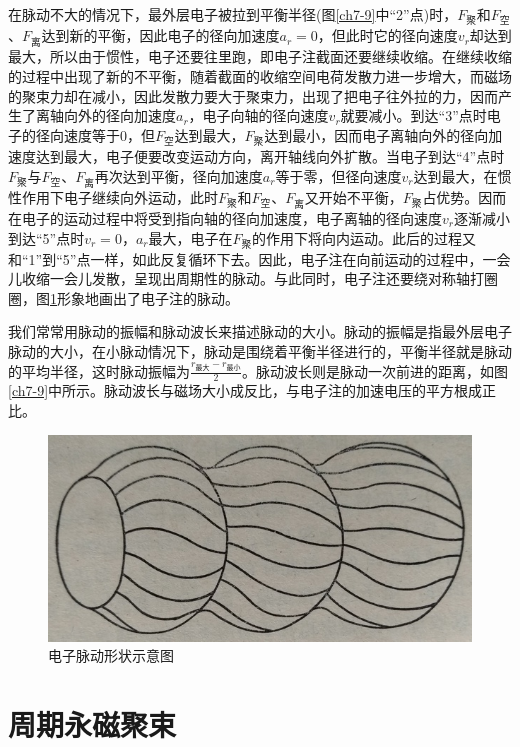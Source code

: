 在脉动不大的情况下，最外层电子被拉到平衡半径(图\ref{ch7-9}中“2”点)时，$ F_{\textrm{聚}}$和$ F_{\textrm{空}} $、$ F_{\textrm{离}} $达到新的平衡，因此电子的径向加速度$ a_r=0 $，但此时它的径向速度$ v_r $却达到最大，所以由于惯性，电子还要往里跑，即电子注截面还要继续收缩。在继续收缩的过程中出现了新的不平衡，随着截面的收缩空间电荷发散力进一步增大，而磁场的聚束力却在减小，因此发散力要大于聚束力，出现了把电子往外拉的力，因而产生了离轴向外的径向加速度$ a_r $，电子向轴的径向速度$ v_r $就要减小。到达“3”点时电子的径向速度等于0，但$ F_{\textrm{空}} $达到最大，$ F_{\textrm{聚}} $达到最小，因而电子离轴向外的径向加速度达到最大，电子便要改变运动方向，离开轴线向外扩散。当电子到达“4”点时$ F_{\textrm{聚}} $与$ F_{\textrm{空}} $、$ F_{\textrm{离}} $再次达到平衡，径向加速度$ a_r $等于零，但径向速度$ v_r $达到最大，在惯性作用下电子继续向外运动，此时$ F_{\textrm{聚}} $和$ F_{\textrm{空}} $、$ F_{\textrm{离}} $又开始不平衡，$ F_{\textrm{聚}} $占优势。因而在电子的运动过程中将受到指向轴的径向加速度，电子离轴的径向速度$ v_r $逐渐减小到达“5”点时$ v_r=0 $，$ a_r $最大，电子在$ F_{\textrm{聚}} $的作用下将向内运动。此后的过程又和“1”到“5”点一样，如此反复循环下去。因此，电子注在向前运动的过程中，一会儿收缩一会儿发散，呈现出周期性的脉动。与此同时，电子注还要绕对称轴打圈圈，图\ref{ch7-10}形象地画出了电子注的脉动。

我们常常用脉动的振幅和脉动波长来描述脉动的大小。脉动的振幅是指最外层电子脉动的大小，在小脉动情况下，脉动是围绕着平衡半径进行的，平衡半径就是脉动的平均半径，这时脉动振幅为$ \frac{r_{\textrm{最大}} - r_{\textrm{最小}}}{2} $。脉动波长则是脉动一次前进的距离，如图\ref{ch7-9}中所示。脉动波长与磁场大小成反比，与电子注的加速电压的平方根成正比。

\begin{figure}[phtb]
	\centering
	\includegraphics[width=0.5\linewidth]{figure/ch7-10}
	\caption{电子脉动形状示意图}
	\label{ch7-10}
\end{figure}
\section{周期永磁聚束}

